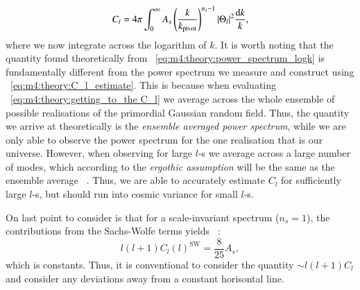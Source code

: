         \begin{equation}\label{eq:m4:theory:power_spectrum_logk}
            C_l = 4\pi\int_0^\infty A_s\left(\frac{k}{k_\mathrm{pivot}}\right)^{n_s-1}\abs{\Theta_l}^2\frac{\mathrm{d} k}{k},
        \end{equation}
        where we now integrate across the logarithm of $k$. It is worth noting that the quantity found theoretically from ~\cref{eq:m4:theory:power_spectrum_logk} is fundamentally different from the power spectrum we measure and construct using ~\cref{eq:m4:theory:C_l_estimate}. This is because when evaluating ~\cref{eq:m4:theory:getting_to_the C_l} we average across the whole ensemble of possible realisations of the primordial Gaussian random field. Thus, the quantity we arrive at theoretically is the \textit{ensemble averaged power spectrum}, while we are only able to observe the power spectrum for the one realisation that is our universe. However, when observing for large $l$-s we average across a large number of modes, which according to the \textit{ergothic assumption} will be the same as the ensemble average ~\cite{AST5220LectureNotes}. Thus, we are able to accurately estimate $C_l$ for sufficiently large $l$-s, but should run into cosmic variance for small $l$-s. 

        On last point to consider is that for a scale-invariant spectrum ($n_s=1$), the contributions from the Sachs-Wolfe terms yields ~\cite[Eq. 9.80]{dodelson2020modern}:
        \begin{equation}
            l(l+1)C_l(l)^\mathrm{SW} = \frac{8}{25} A_s,
        \end{equation}
        which is constants. Thus, it is conventional to consider the quantity $\sim l(l+1)C_l$ and consider any deviations away from a constant horisontal line. 

